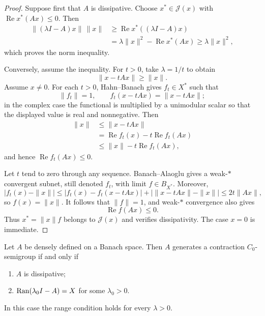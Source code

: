 \begin{proof}
Suppose first that $A$ is dissipative.  Choose $x^*\in\mathcal J(x)$ with
$\operatorname{Re}x^*(Ax)\le0$.  Then
\[
\begin{aligned}
 \|(\lambda I-A)x\|\,\|x\|
  &\ge\operatorname{Re}x^*((\lambda I-A)x)\\
  &=\lambda\|x\|^2-\operatorname{Re}x^*(Ax)
   \ge\lambda\|x\|^2,
\end{aligned}
\]
which proves the norm inequality.

Conversely, assume the inequality.  For $t>0$, take $\lambda=1/t$ to obtain
\[
  \|x-tAx\|\ge\|x\|.
\]
Assume $x\ne0$.  For each $t>0$, Hahn--Banach gives $f_t\in X^*$ such that
\[
  \|f_t\|=1,
  \qquad
  f_t(x-tAx)=\|x-tAx\|;
\]
in the complex case the functional is multiplied by a unimodular scalar so
that the displayed value is real and nonnegative.  Then
\[
\begin{aligned}
  \|x\|
  &\le\|x-tAx\|\\
  &=\operatorname{Re}f_t(x)-t\operatorname{Re}f_t(Ax)\\
  &\le\|x\|-t\operatorname{Re}f_t(Ax),
\end{aligned}
\]
and hence $\operatorname{Re}f_t(Ax)\le0$.

Let $t$ tend to zero through any sequence.  Banach--Alaoglu gives a weak-$*$
convergent subnet, still denoted $f_t$, with limit $f\in B_{X^*}$.  Moreover,
\[
  |f_t(x)-\|x\||
  \le |f_t(x)-f_t(x-tAx)|
      +\bigl|\|x-tAx\|-\|x\|\bigr|
  \le 2t\|Ax\|,
\]
so $f(x)=\|x\|$.  It follows that $\|f\|=1$, and weak-$*$ convergence also
gives
\[
  \operatorname{Re}f(Ax)\le0.
\]
Thus $x^*=\|x\|f$ belongs to $\mathcal J(x)$ and verifies dissipativity.  The
case $x=0$ is immediate.
\end{proof}

\begin{notetheorem}
Let $A$ be densely defined on a Banach space.  Then $A$ generates a contraction
$C_0$-semigroup if and only if
\begin{enumerate}
  \item $A$ is dissipative;
  \item $\operatorname{Ran}(\lambda_0I-A)=X$ for some $\lambda_0>0$.
\end{enumerate}
In this case the range condition holds for every $\lambda>0$.
\end{notetheorem}

